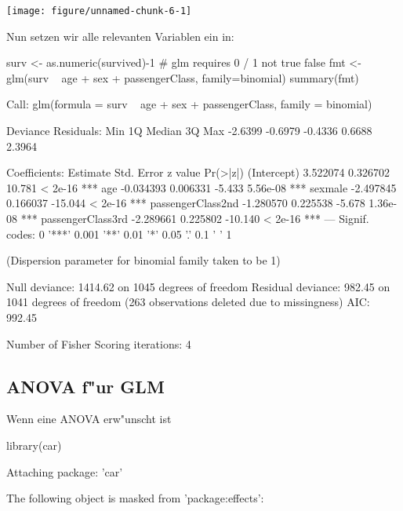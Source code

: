 \documentclass[a4paper,twoside]{tufte-book}\usepackage[]{graphicx}\usepackage[]{color}
\makeatletter
\def\maxwidth{ %
  \ifdim\Gin@nat@width>\linewidth
    \linewidth
  \else
    \Gin@nat@width
  \fi
}
\makeatother
\begin{document}
\begin{appendices}
\begin{Schunk}
\texttt{[image: figure/unnamed-chunk-6-1]} \end{Schunk}


Nun setzen wir alle relevanten Variablen ein in:

\begin{Schunk}
\begin{Sinput}
surv <- as.numeric(survived)-1 # glm requires 0 / 1 not true false
fmt <- glm(surv ~ age  + sex + passengerClass, family=binomial)
summary(fmt)
\end{Sinput}
\begin{Soutput}

Call:
glm(formula = surv ~ age + sex + passengerClass, family = binomial)

Deviance Residuals: 
    Min       1Q   Median       3Q      Max  
-2.6399  -0.6979  -0.4336   0.6688   2.3964  

Coefficients:
                   Estimate Std. Error z value Pr(>|z|)    
(Intercept)        3.522074   0.326702  10.781  < 2e-16 ***
age               -0.034393   0.006331  -5.433 5.56e-08 ***
sexmale           -2.497845   0.166037 -15.044  < 2e-16 ***
passengerClass2nd -1.280570   0.225538  -5.678 1.36e-08 ***
passengerClass3rd -2.289661   0.225802 -10.140  < 2e-16 ***
---
Signif. codes:  0 '***' 0.001 '**' 0.01 '*' 0.05 '.' 0.1 ' ' 1

(Dispersion parameter for binomial family taken to be 1)

    Null deviance: 1414.62  on 1045  degrees of freedom
Residual deviance:  982.45  on 1041  degrees of freedom
  (263 observations deleted due to missingness)
AIC: 992.45

Number of Fisher Scoring iterations: 4
\end{Soutput}
\end{Schunk}

\subsection{ANOVA f"ur GLM}

Wenn eine ANOVA erw"unscht ist


\begin{Schunk}
\begin{Sinput}
library(car)
\end{Sinput}
\begin{Soutput}

Attaching package: 'car'
\end{Soutput}
\begin{Soutput}
The following object is masked from 'package:effects':


\end{Soutput}
\end{Schunk}
\end{appendices}
\end{document}
